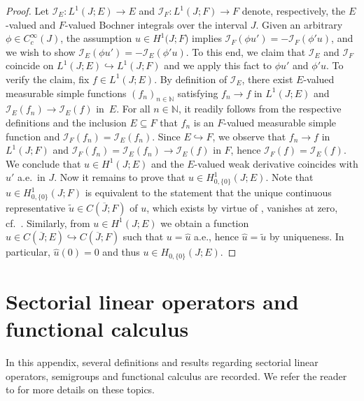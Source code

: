 \documentclass[reqno]{amsart}
\numberwithin{equation}{section}
\newcommand{\N}{\mathbb{N}}
\newcommand{\from}{\colon}
\theoremstyle{remark}
\theoremstyle{definition}
\begin{document}
\begin{proof}
	Let $\mathscr I_E \from L^1(J;E)\to E$ and 
	$\mathscr I_F \from L^1(J;F) \to F$ denote, respectively,
	the $E$-valued and $F$-valued Bochner integrals over 
	the interval $J$. 
	Given an arbitrary $\phi \in C_c^\infty(J)$, 
	the assumption
	$u \in H^1(J;F$)
	implies 
	$
	\mathscr I_F(\phi u') 
	= 
	-\mathscr I_F(\phi' u)
	$, and
	we wish to show
	$
	\mathscr I_E(\phi u') 
	= 
	-\mathscr I_E(\phi' u).
	$
	To this end, we claim that
	$\mathscr I_E$ and $\mathscr I_F$ coincide on
	$L^1(J;E) \hookrightarrow L^1(J;F)$
	and we apply this fact to 
	$\phi u'$ and $\phi' u$.
	To verify the claim, fix $f \in L^1(J;E)$.
	By definition
	of $\mathscr I_E$, there exist $E$-valued 
	measurable simple functions $(f_n)_{n\in\N}$
	satisfying $f_n \to f$ in $L^1(J;E)$ and 
	$\mathscr I_E(f_n) \to \mathscr I_E(f)$ in~$E$. For all $n \in \N$, 
	it readily follows from the
	respective definitions and the inclusion $E \subseteq F$ that
	$f_n$ is an $F$-valued measurable simple function and 
	$\mathscr I_F(f_n) = \mathscr I_E(f_n)$. 
	Since $E \hookrightarrow F$, we observe that
	$f_n \to f$ in $L^1(J;F)$ and 
	$\mathscr I_F(f_n) = \mathscr I_E(f_n) \to \mathscr I_E(f)$ in $F$, 
	hence $\mathscr I_F(f) = \mathscr I_E(f)$.
	We conclude that $u\in H^1(J;E)$ 
	and the $E$-valued weak derivative 
	coincides with $u'$ a.e.\ in $J$. 
	Now it remains to prove that $u \in H^1_{0,\{0\}}(J; E)$. 
	Note that
	$u \in H^1_{0,\{0\}}(J;F)$ is equivalent to 
	the statement that the unique continuous representative
	$\widetilde u \in C(\overline J; F)$ of $u$, 
	which exists 
	by virtue of \cite[\S5.9.2, Theorem~2]{Evans2010}, 
	vanishes at zero,
	cf.~\cite[\S5.5, Theorem~2]{Evans2010}.
	Similarly, from $u \in H^1(J; E)$ we obtain a function 
	$\widehat u \in C(\overline J; E) \hookrightarrow C(\overline J; F)$ 
	such that $u = \widehat u$ a.e.,
	hence $\widehat u = \widetilde u$ by uniqueness.
	In particular, $\widehat u(0) = 0$ and thus $u \in H_{0,\{0\}}(J;E)$. 
\end{proof} 


\section{Sectorial linear operators and functional calculus}
\label{app:functional-calc} 

In this appendix, several definitions and results 
regarding sectorial linear operators, 
semigroups and functional calculus 
are recorded. 
We refer the reader to \cite{Engel1999,Haase2006,AnalysisInBanachSpacesII,Pazy1983} 
for more details on these topics. 
\end{document}
